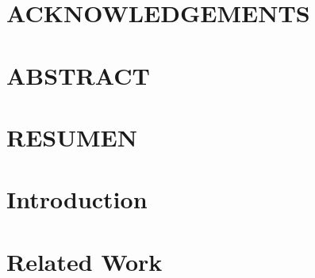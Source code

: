 \documentclass[pdftex]{pucthesis}	%
\begin{document}


 \label{acknowledgements} %
\chapter*{ACKNOWLEDGEMENTS}           


\cleardoublepage



\tableofcontents
{} \label{listoffigures}
\listoffigures
{} \label{listoftables}
\listoftables
\cleardoublepage



 \label{abstract}
\chapter*{ABSTRACT}

\cleardoublepage

 \label{resumen}
\chapter*{RESUMEN}

\cleardoublepage



\chapter[INTRODUCTION]{Introduction}


\chapter[RELATED WORK]{Related Work} \label{work}

\end{document}

